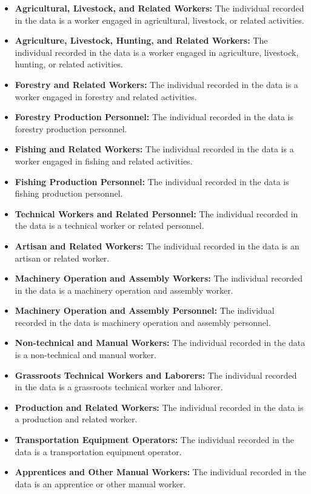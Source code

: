 \documentclass[twocolumn]{article}
\begin{document}
\begin{itemize}
    \item \textbf{Agricultural, Livestock, and Related Workers:} The individual recorded in the data is a worker engaged in agricultural, livestock, or related activities.
    \item \textbf{Agriculture, Livestock, Hunting, and Related Workers:} The individual recorded in the data is a worker engaged in agriculture, livestock, hunting, or related activities.
    \item \textbf{Forestry and Related Workers:} The individual recorded in the data is a worker engaged in forestry and related activities.
    \item \textbf{Forestry Production Personnel:} The individual recorded in the data is forestry production personnel.
    \item \textbf{Fishing and Related Workers:} The individual recorded in the data is a worker engaged in fishing and related activities.
    \item \textbf{Fishing Production Personnel:} The individual recorded in the data is fishing production personnel.
    \item \textbf{Technical Workers and Related Personnel:} The individual recorded in the data is a technical worker or related personnel.
    \item \textbf{Artisan and Related Workers:} The individual recorded in the data is an artisan or related worker.
    \item \textbf{Machinery Operation and Assembly Workers:} The individual recorded in the data is a machinery operation and assembly worker.
    \item \textbf{Machinery Operation and Assembly Personnel:} The individual recorded in the data is machinery operation and assembly personnel.
    \item \textbf{Non-technical and Manual Workers:} The individual recorded in the data is a non-technical and manual worker.
    \item \textbf{Grassroots Technical Workers and Laborers:} The individual recorded in the data is a grassroots technical worker and laborer.
    \item \textbf{Production and Related Workers:} The individual recorded in the data is a production and related worker.
    \item \textbf{Transportation Equipment Operators:} The individual recorded in the data is a transportation equipment operator.
    \item \textbf{Apprentices and Other Manual Workers:} The individual recorded in the data is an apprentice or other manual worker.

\end{itemize}
\end{document}
